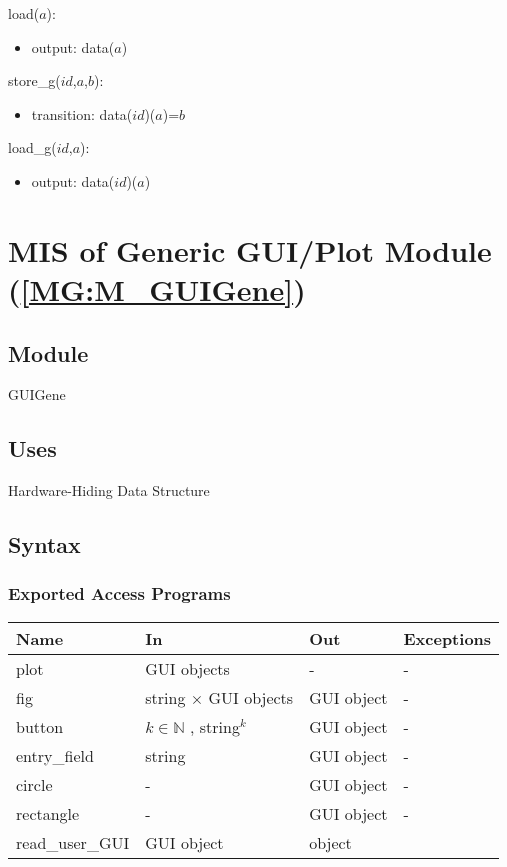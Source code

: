 \documentclass[12pt, titlepage]{article}
\begin{document}
\noindent load($a$):
\begin{itemize}
\item output: data($a$)
\end{itemize}

\noindent store{\_}g($id$,$a$,$b$):
\begin{itemize}
\item transition: data($id$)($a$)=$b$
\end{itemize}

\noindent load{\_}g($id$,$a$):
\begin{itemize}
\item output: data($id$)($a$)
\end{itemize}

\section{MIS of Generic GUI/Plot Module (\texorpdfstring{\cref{MG:M_GUIGene}}))} \label{MIS_GUIGene}

\subsection{Module}
GUIGene
\subsection{Uses}
Hardware-Hiding
Data Structure
\subsection{Syntax}

\subsubsection{Exported Access Programs}

\begin{center}
\begin{tabular}{p{2cm} p{4cm} p{4cm} p{2cm}}
\hline
\textbf{Name} & \textbf{In} & \textbf{Out} & \textbf{Exceptions} \\
\hline
plot & GUI objects & - & - \\
fig & string $\times$ GUI objects &  GUI object & - \\
button & $k \in \mathbb{N}$ , {string}$^{k}$ &  GUI object & - \\
entry{\_}field & string &  GUI object & - \\
circle & - &  GUI object & - \\
rectangle & - & GUI object & - \\
read{\_}user{\_}GUI & GUI object & object \\
\hline
\end{tabular}
\end{center}
\end{document}
